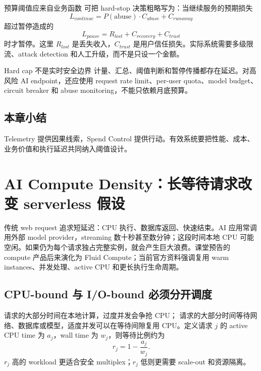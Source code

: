 \documentclass[a4paper]{article}
\begin{document}
\begin{importantbox}{预算阈值应来自业务函数}
可把 hard-stop 决策粗略写为：当继续服务的预期损失
\[
L_{continue}=P(\text{abuse})\cdot C_{abuse}+C_{runaway}
\]
超过暂停造成的
\[
L_{pause}=R_{lost}+C_{recovery}+C_{trust}
\]
时才暂停。这里 $R_{lost}$ 是丢失收入，$C_{trust}$ 是用户信任损失。实际系统需要多级限流、attack detection 和人工升级，而不是只设一个金额。
\end{importantbox}

\begin{warningbox}{Hard cap 不是实时安全边界}
计量、汇总、阈值判断和暂停传播都存在延迟。对高风险 AI endpoint，还应使用 request rate limit、per-user quota、model budget、circuit breaker 和 abuse monitoring，不能只依赖月底预算。
\end{warningbox}


\subsection{本章小结}

Telemetry 提供因果线索，Spend Control 提供行动。有效系统要把性能、成本、业务价值和执行延迟共同纳入阈值设计。

\section{AI Compute Density：长等待请求改变 serverless 假设}

传统 web request 追求短延迟：CPU 执行、数据库返回、快速结束。AI 应用常调用外部 model provider，streaming 数十秒甚至数分钟；这段时间本地 CPU 可能空闲。如果仍为每个请求独占完整实例，就会产生巨大浪费。课堂预告的 compute 产品后来演化为 Fluid Compute；当前官方资料强调复用 warm instances、并发处理、active CPU 和更长执行生命周期。

\subsection{CPU-bound 与 I/O-bound 必须分开调度}

 请求的大部分时间在本地计算，过度并发会争抢 CPU； 请求的大部分时间等待网络、数据库或模型，适度并发可以在等待间隙复用 CPU。定义请求 $j$ 的 active CPU time 为 $a_j$，wall time 为 $w_j$，则等待比例约为
\[
r_j=1-\frac{a_j}{w_j}.
\]
$r_j$ 高的 workload 更适合安全 multiplex；$r_j$ 低则更需要 scale-out 和资源隔离。
\end{document}
